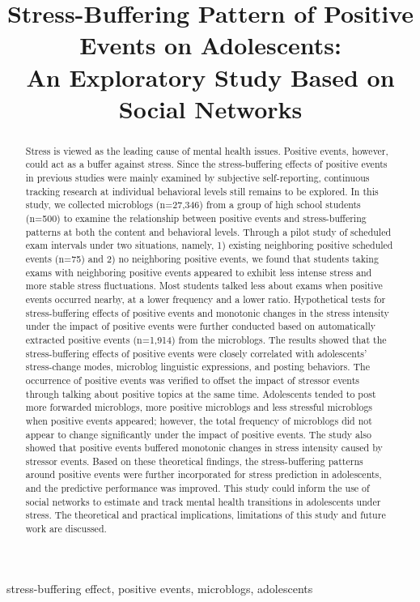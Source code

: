 \documentclass[5p,times,numbers,authoryear]{elsarticle}
\begin{document}
\begin{frontmatter}

\title{Stress-Buffering Pattern of Positive Events on Adolescents: \\
An Exploratory Study Based on Social Networks}


\begin{abstract}
Stress is viewed as the leading cause of mental health issues. Positive events, however, could act as a buffer against stress. Since the stress-buffering effects of positive events in previous studies were mainly examined by subjective self-reporting, continuous tracking research at individual behavioral levels still remains to be explored. In this study, we collected microblogs (n=27,346) from a group of high school students (n=500) to examine the relationship between positive events and stress-buffering patterns at both the content and behavioral levels. Through a pilot study of scheduled exam intervals under two situations, namely, 1) existing neighboring positive scheduled events (n=75) and 2) no neighboring positive events, we found that students taking exams with neighboring positive events appeared to exhibit less intense stress and more stable stress fluctuations.
Most students talked less about exams when positive events occurred nearby, at a lower frequency and a lower ratio.
Hypothetical tests for stress-buffering effects of positive events and monotonic changes in the stress intensity under the impact of positive events were further conducted based on automatically extracted positive events (n=1,914) from the microblogs.
The results showed that the stress-buffering effects of positive events were closely correlated with adolescents' stress-change modes, microblog linguistic expressions, and posting behaviors.
The occurrence of positive events was verified to offset the impact of stressor events through talking about positive topics at the same time.
Adolescents tended to post more forwarded microblogs, more positive microblogs and less stressful microblogs when positive events appeared;
however, the total frequency of microblogs did not appear to change significantly under the impact of positive events.
The study also showed that positive events buffered monotonic changes in stress intensity caused by stressor events.
Based on these theoretical findings, the stress-buffering patterns around positive events were further incorporated for stress prediction in adolescents, and the predictive performance was improved.
This study could inform the use of social networks to estimate and track mental health transitions in adolescents under stress. The theoretical and practical implications, limitations of this study and future work are discussed.
\end{abstract}

\begin{keyword}
stress-buffering effect, positive events, microblogs, adolescents
\end{keyword}
\end{frontmatter}
\end{document}
